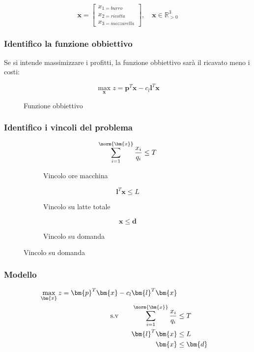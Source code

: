 \documentclass[\main/main.tex]{subfiles}
\begin{document}
\[
  \bm{x} = \begin{bmatrix}
    x_{1 = burro}   \\
    x_{2 = ricotta} \\
    x_{3 = mozzarella}
  \end{bmatrix},
  \quad
  \bm{x} \in \mathbb{R}^3_{>0}
\]

\subsubsection*{Identifico la funzione obbiettivo}
Se si intende massimizzare i profitti, la funzione obbiettivo sarà il ricavato meno i costi:

\begin{figure}
  \[
    \max_{\bm{x}} z = \bm{p}^T\bm{x} - c_l\bm{l}^T\bm{x}
  \]
  \caption{Funzione obbiettivo}
\end{figure}

\subsubsection*{Identifico i vincoli del problema}

\begin{figure}
  \begin{subfigure}{0.31\textwidth}
    \[
      \sum_{i=1}^{\norm{\bm{x}}} \frac{x_i}{q_i} \leq T
    \]
    \caption{Vincolo ore macchina}
  \end{subfigure}
  \begin{subfigure}{0.31\textwidth}
    \[
      \bm{l}^T\bm{x} \leq L
    \]
    \caption{Vincolo su latte totale}
  \end{subfigure}
  \begin{subfigure}{0.31\textwidth}
    \[
      \bm{x} \leq \bm{d}
    \]
    \caption{Vincolo su domanda}
  \end{subfigure}
\end{figure}

\subsubsection*{Modello}

\begin{align*}
  \max_{\bm{x}} z = \bm{p}^T\bm{x} - c_l\bm{l}^T\bm{x}                       \\
  \text{s.v} \qquad \sum_{i=1}^{\norm{\bm{x}}} \frac{x_i}{q_i} & \leq T      \\
  \bm{l}^T\bm{x}                                               & \leq L      \\
  \bm{x}                                                       & \leq \bm{d} \\
\end{align*}
\end{document}
